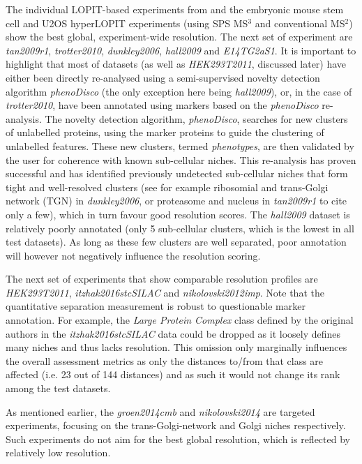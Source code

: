 \documentclass[12pt]{article}\usepackage[]{graphicx}\usepackage[]{color}
\begin{document}
The individual LOPIT-based experiments from \citet{JeanBeltran:2016}
and the embryonic mouse stem cell \citep{Christoforou:2016} and U2OS
\citep{Thul:2017} hyperLOPIT experiments (using SPS MS$^3$ and
conventional MS$^2$) show the best global, experiment-wide
resolution. The next set of experiment are \textit{tan2009r1},
\textit{trotter2010}, \textit{dunkley2006}, \textit{hall2009} and
\textit{E14TG2aS1}. It is important to highlight that most of datasets
(as well as \textit{HEK293T2011}, discussed later) have either been
directly re-analysed using a semi-supervised novelty detection
algorithm \textit{phenoDisco} \citep{Breckels:2013} (the only
exception here being \textit{hall2009}), or, in the case of
\textit{trotter2010}, have been annotated using markers based on the
\textit{phenoDisco} re-analysis. The novelty detection algorithm,
\textit{phenoDisco}, searches for new clusters of unlabelled proteins,
using the marker proteins to guide the clustering of unlabelled
features. These new clusters, termed \textit{phenotypes}, are then
validated by the user for coherence with known sub-cellular niches.
This re-analysis has proven successful \citep{Breckels:2013} and has
identified previously undetected sub-cellular niches that form tight
and well-resolved clusters (see for example ribosomial and trans-Golgi
network (TGN) in \textit{dunkley2006}, or proteasome and nucleus in
\textit{tan2009r1} to cite only a few), which in turn favour good
resolution scores. The \textit{hall2009} dataset is relatively poorly
annotated (only 5 sub-cellular clusters, which is the lowest in all
test datasets). As long as these few clusters are well separated, poor
annotation will however not negatively influence the resolution
scoring.



The next set of experiments that show comparable resolution profiles
are \textit{HEK293T2011}, \textit{itzhak2016stcSILAC} and
\textit{nikolovski2012imp}. Note that the quantitative separation
measurement is robust to questionable marker annotation. For example,
the \textit{Large Protein Complex} class defined by the original
authors in the \textit{itzhak2016stcSILAC} data could be dropped as it
loosely defines many niches and thus lacks resolution. This omission only
marginally influences the overall assessment metrics as only the
distances to/from that class are affected (i.e. 23
out of 144 distances) and as such it would not change its
rank among the test datasets.

As mentioned earlier, the \textit{groen2014cmb} and
\textit{nikolovski2014} are targeted experiments, focusing on the
trans-Golgi-network and Golgi niches respectively. Such experiments do
not aim for the best global resolution, which is reflected by relatively
low resolution.
\end{document}
